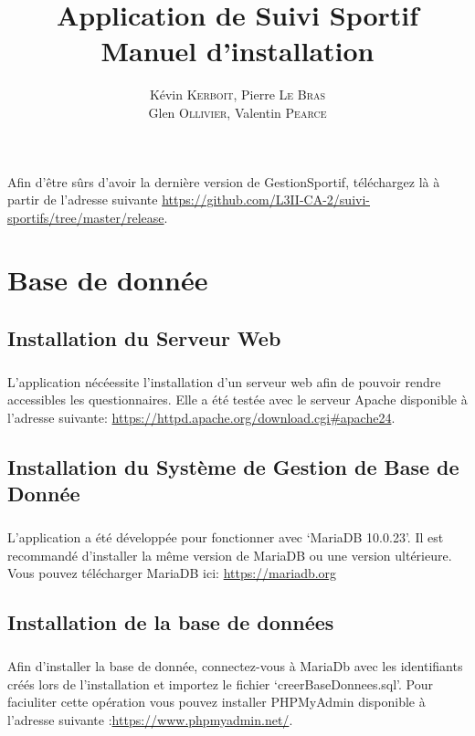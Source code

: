 \documentclass[french,12pt,a4paper,openany]{book}
\author{Kévin \textsc{Kerboit}, Pierre \textsc{Le Bras}\\Glen \textsc{Ollivier}, Valentin \textsc{Pearce}}
\date{}
\begin{document}
\title{Application de Suivi Sportif \\ Manuel d'installation}
\maketitle
\tableofcontents
\paragraph{}{Afin d'être sûrs d'avoir la dernière version de GestionSportif, téléchargez là à partir de l'adresse suivante \url{https://github.com/L3II-CA-2/suivi-sportifs/tree/master/release}.}

\chapter{Base de donnée}
\section{Installation du Serveur Web}
\paragraph{}{L'application nécéessite l'installation d'un serveur web afin de pouvoir rendre accessibles les questionnaires. Elle a été testée avec le serveur Apache disponible à l'adresse suivante: \url{https://httpd.apache.org/download.cgi#apache24}.}
\section{Installation du Système de Gestion de Base de Donnée}
\paragraph{}{L'application a été développée pour fonctionner avec `MariaDB 10.0.23'. Il est recommandé d'installer la même version de MariaDB ou une version ultérieure. Vous pouvez télécharger MariaDB ici: \url{https://mariadb.org} }
\section{Installation de la base de données}
\paragraph{}{Afin d'installer la base de donnée, connectez-vous à MariaDb avec les identifiants créés lors de l'installation et importez le fichier `creerBaseDonnees.sql'. Pour faciuliter cette opération vous pouvez installer PHPMyAdmin disponible à l'adresse suivante :\url{https://www.phpmyadmin.net/}.}
\end{document}

